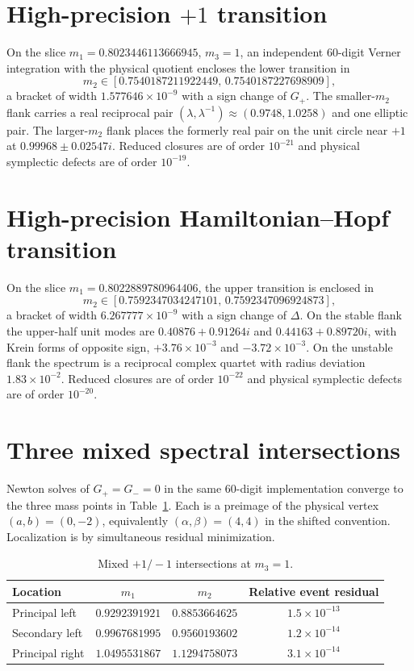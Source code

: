 \documentclass[aps,prl,onecolumn,amsmath,amssymb]{revtex4-2}
\begin{document}
\section{High-precision $+1$ transition}

On the slice $m_1=0.8023446113666945$, $m_3=1$, an independent $60$-digit
Verner integration with the physical quotient encloses the lower transition in
\begin{equation}
m_2\in[0.7540187211922449,\,0.7540187227698909],
\end{equation}
a bracket of width $1.577646\times10^{-9}$ with a sign change of $G_+$. The
smaller-$m_2$ flank carries a real reciprocal pair
$(\lambda,\lambda^{-1})\approx(0.9748,1.0258)$ and one elliptic pair. The
larger-$m_2$ flank places the formerly real pair on the unit circle near $+1$
at $0.99968\pm0.02547i$. Reduced closures are of order $10^{-21}$ and physical
symplectic defects are of order $10^{-19}$.

\section{High-precision Hamiltonian--Hopf transition}

On the slice $m_1=0.8022889780964406$, the upper transition is enclosed in
\begin{equation}
m_2\in[0.7592347034247101,\,0.7592347096924873],
\end{equation}
a bracket of width $6.267777\times10^{-9}$ with a sign change of $\Delta$.
On the stable flank the upper-half unit modes are
$0.40876+0.91264i$ and $0.44163+0.89720i$, with Krein forms of opposite sign,
$+3.76\times10^{-3}$ and $-3.72\times10^{-3}$. On the unstable flank the
spectrum is a reciprocal complex quartet with radius deviation
$1.83\times10^{-2}$. Reduced closures are of order $10^{-22}$ and physical
symplectic defects are of order $10^{-20}$.

\section{Three mixed spectral intersections}

Newton solves of $G_+=G_-=0$ in the same $60$-digit implementation converge to
the three mass points in Table~\ref{tab:mixed}. Each is a preimage of the
physical vertex $(a,b)=(0,-2)$, equivalently $(\alpha,\beta)=(4,4)$ in the
shifted convention. Localization is by simultaneous residual minimization.

\begin{table}[ht]
\centering
\caption{Mixed $+1/-1$ intersections at $m_3=1$.}
\label{tab:mixed}
\begin{tabular}{lccc}
\toprule
Location & $m_1$ & $m_2$ & Relative event residual \\
\midrule
Principal left  & $0.9292391921$ & $0.8853664625$ & $1.5\times10^{-13}$ \\
Secondary left  & $0.9967681995$ & $0.9560193602$ & $1.2\times10^{-14}$ \\
Principal right & $1.0495531867$ & $1.1294758073$ & $3.1\times10^{-14}$ \\
\bottomrule
\end{tabular}
\end{table}
\end{document}
